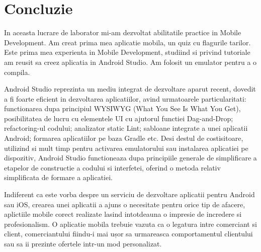 \section*{Concluzie}


In aceasta lucrare de laborator mi-am dezvoltat abilitatile practice in Mobile Development. Am creat prima mea aplicatie mobila, un quiz cu flagurile tarilor. Este prima mea experienta in Mobile Development, studiind si privind tutoriale am reusit sa creez aplicatia in Android Studio. Am folosit un emulator pentru a o compila. 

Android Studio reprezinta un mediu integrat de dezvoltare aparut recent, dovedit a fi foarte eficient in dezvoltarea aplicatiilor, avind urmatoarele particularitati: functionarea dupa principiul WYSIWYG (What You See Is What You Get), posibilitatea de lucru cu elementele UI cu ajutorul functiei Dag-and-Drop; refactoring-ul codului; analizator static Lint; sabloane integrate a unei aplicatii Android; formarea aplicatiilor pe baza Gradle etc.  Desi destul de costisitoare, utilizind si mult timp pentru activarea emulatorului sau instalarea aplicatiei pe dispozitiv, Android Studio functioneaza dupa principiile generale de simplificare a etapelor de constructie a codului si interfetei, oferind o metoda relativ simplificata de formare a aplicatiei.


Indiferent ca este vorba despre un serviciu de dezvoltare aplicatii pentru Android sau iOS, crearea unei aplicatii a ajuns o necesitate pentru orice tip de afacere, aplictiile mobile corect realizate lasind intotdeauna o impresie de incredere si profesionalism. O aplicatie mobila trebuie vazuta ca o legatura intre comerciant si client, comerciantului fiindu-i mai ușor sa urmareasca comportamentul clientului sau sa ii prezinte ofertele intr-un mod personalizat.

\clearpage
